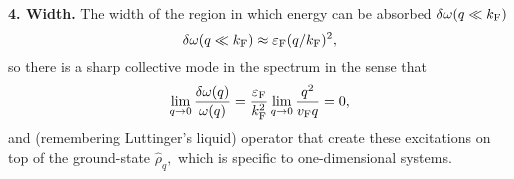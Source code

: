 \textbf{4. Width.} The width of the region in which energy can be absorbed $\delta \omega (q \ll k_{\textnormal{F}})$ 
\begin{equation*}
	\delta \omega (q \ll k_{\textnormal{F}}) \approx \varepsilon_\text{F} (q / k_{\textnormal{F}})^2,
\end{equation*}
so there is  a sharp collective mode in the spectrum
in the sense that 
\begin{equation*}
	\lim_{q \to 0} \frac{\delta \omega (q)}{\omega(q)} = \frac{\varepsilon_\text{F}}{k_{\textnormal{F}}^2}\lim_{q \to 0} \frac{q^2}{v_{\textnormal{F}} q} = 0,
\end{equation*}
and (remembering Luttinger's liquid) operator that create these
excitations on top of the ground-state 
$
	\hat{\rho}_q,
$
which is specific to one-dimensional systems.